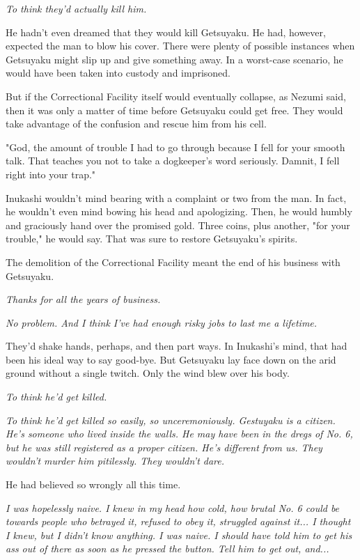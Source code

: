 \emph{To think they'd actually kill him.}

He hadn't even dreamed that they would kill Getsuyaku. He had, however,
expected the man to blow his cover. There were plenty of possible
instances when Getsuyaku might slip up and give something away. In a
worst-case scenario, he would have been taken into custody and
imprisoned.

But if the Correctional Facility itself would eventually collapse, as
Nezumi said, then it was only a matter of time before Getsuyaku could
get free. They would take advantage of the confusion and rescue him from
his cell.

"God, the amount of trouble I had to go through because I fell for your
smooth talk. That teaches you not to take a dogkeeper's word seriously.
Damnit, I fell right into your trap."

Inukashi wouldn't mind bearing with a complaint or two from the man. In
fact, he wouldn't even mind bowing his head and apologizing. Then, he
would humbly and graciously hand over the promised gold. Three coins,
plus another, "for your trouble," he would say. That was sure to restore
Getsuyaku's spirits.

The demolition of the Correctional Facility meant the end of his
business with Getsuyaku.

\emph{Thanks for all the years of business.}

\emph{No problem. And I think I've had enough risky jobs to last me a
	lifetime.}

They'd shake hands, perhaps, and then part ways. In Inukashi's mind,
that had been his ideal way to say good-bye. But Getsuyaku lay face down
on the arid ground without a single twitch. Only the wind blew over his
body.

\emph{To think he'd get killed.}

\emph{To think he'd get killed so easily, so unceremoniously. Gestuyaku is a
	citizen. He's someone who lived inside the walls. He may have been in
	the dregs of No. 6, but he was still registered as a proper citizen.
	He's different from us. They wouldn't murder him pitilessly. They wouldn't dare.}

He had believed so wrongly all this time.

\emph{I was hopelessly naive. I knew in my head how cold, how brutal No. 6
	could be towards people who betrayed it, refused to obey it, struggled
	against it... I thought I knew, but I didn't know anything. I was naive.
	I should have told him to get his ass out of there as soon as he pressed
	the button. Tell him to get out, and...}


